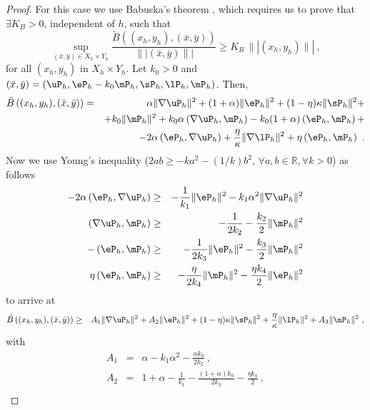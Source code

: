 \begin{proof}
  For this case we use Babuska's theorem \cite{Demkowicz2006}, which requires us to prove that $\exists K_B>0$, independent of $h$, such that
 \begin{equation}
 \sup_{(\bar{x},\bar{y})\in X_h\times Y_h} \frac{\tilde{B}\left ( (x_h,y_h), (\bar{x},\bar{y}) \right )}
 {\||(\bar{x},\bar{y})\||} \geq K_B\,\||(x_h,y_h)\||~,
 \end{equation}
 for all $(x_h,y_h)$ in $X_h\times Y_h$. Let $k_0 > 0$ and
 $(\bar{x},\bar{y})=\left (\uP_h, \eP_h - k_0 \mP_h, \sP_h, \lP_h, \mP_h \right )$. Then,
 \begin{eqnarray}
 \tilde{B}\left ((x_h,y_h), (\bar{x},\bar{y}) \right ) & = &
 \alpha \|\nabla \uP_h\|^2 + (1+\alpha) \|\eP_h\|^2 + (1-\eta) \kappa \|\sP_h\|^2 + \nonumber \\
 & & + k_0 \|\mP_h\|^2 + k_0 \alpha \left ( \nabla \uP_h, \mP_h \right ) 
 - k_0 (1+\alpha) \left ( \eP_h,\mP_h \right ) + \nonumber \\
 & & - 2\alpha \left ( \eP_h , \nabla \uP_h \right ) +\frac{\eta}{\kappa} \|\nabla \lP_h\|^2
 + \eta \left ( \eP_h , \mP_h \right )~.
 \end{eqnarray}
 Now we use Young's inequality ($2ab\geq -k a^2-(1/k)b^2$, $\forall a, b \in \mathbb{R}, \forall k>0$) as follows
 \begin{eqnarray*}
 -2\alpha \left ( \eP_h, \nabla \uP_h \right ) & \geq &
 -\frac{1}{k_1} \| \eP_h \|^2 - k_1 \alpha^2 \|\nabla \uP_h \|^2 \\
 \left ( \nabla \uP_h, \mP_h \right ) & \geq & -\frac{1}{2k_2} 
 - \frac{k_2}{2} \|\mP_h\|^2 \\
 -\left ( \eP_h, \mP_h \right ) & \geq & -\frac{1}{2 k_3} \|\eP_h \|^2
 - \frac{k_3}{2} \|\mP_h\|^2 \\
 \eta \left ( \eP_h, \mP_h \right ) & \geq & -\frac{\eta}{2 k_4} \|\mP_h\|^2
 - \frac{\eta k_4}{2} \|\eP_h\|^2
 \end{eqnarray*}
 to arrive at
 \begin{eqnarray*}
 \tilde{B}\left ((x_h,y_h), (\bar{x},\bar{y}) \right ) & \geq & 
 A_1 \|\nabla \uP_h\|^2 + A_2 \|\eP_h\|^2 + (1-\eta) \kappa \|\sP_h\|^2 +
 \frac{\eta}{\kappa} \|\lP_h\|^2 + A_3 \|\mP_h\|^2~,
 \end{eqnarray*}
 with
 \begin{eqnarray*}
 A_1 & = & \alpha - k_1 \alpha^2 - \frac{\alpha k_0}{2 k_2}~, \\
 A_2 & = & 1+\alpha - \frac{1}{k_1} - \frac{(1+\alpha)k_0}{2 k_3} - \frac{\eta k_4}{2}~, \\

\end{eqnarray*}
\end{proof}
